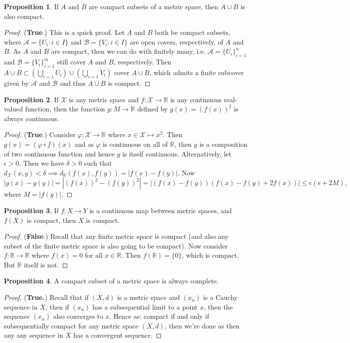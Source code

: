 \documentclass[oneside]{amsart}
\theoremstyle{definition}
\newtheorem{prop}{Proposition}[section]
\newcommand{\rr}{\mathbb R}
\begin{document}
\begin{prop}
If $A$ and $B$ are compact subsets of a metric space, then $A \cup B$ is also compact.	
\end{prop}
\begin{proof}
	(\textbf{True}.) This is a quick proof. Let $A$ and $B$ both be compact subsets, where $\mathcal A = \{ U_i \colon i \in I \}$  and $\mathcal B = \{ V_i \colon i \in I \}$ are open covers, respectively, of $A$ and $B$. As $A$ and $B$ are compact, then we can do with finitely many, i.e. $\mathcal A = \{U_i \}_{i=1}^n$ and $\mathcal B = \{ V_i \}_{i=1}^m$ still cover $A$ and $B$, respectively. Then $A \cup B \subset (\bigcup_{i=1} U_i ) \cup (\bigcup_{i=1} V_i)$ cover $A \cup B$, which admits a finite subcover given by $\mathcal A$ and $\mathcal B$ and thus $A \cup B$ is compact. 
\end{proof}
\begin{prop}
If $\mathcal X$ is any metric space and $f \colon \mathcal X \to \rr$ is any continuous real-valued function, then the function $g \colon M \to \rr$ defined by $g(x) = (f(x))^2$ is always continuous.	
\end{prop}
\begin{proof} (\textbf{True}.) Consider $\varphi \colon \mathcal X \to \rr $ where $x \in \mathcal X\mapsto x^2$. Then $g (x) = (\varphi \circ f) (x)$ and as $\varphi$ is continuous on all of $\rr$, then $g$ is a composition of two continuous function and hence $g$ is itself continuous. Alternatively, let $\epsilon > 0$. Then we have $\delta > 0$ such that $d_\mathcal X (x,y) < \delta \implies d_\rr (f(x), f(y)) = |f(x) - f(y)|.$ Now 
\[
|g(x)-g(y)| = |(f(x))^2-(f(y))^2| = |(f(x)-f(y))(f(x)-f(y)+2f(x))| \leq \epsilon (\epsilon + 2M),
\] where $M = |f(y)|$.
\end{proof}

\begin{prop}
If $f \colon X \to Y$ is a continuous map between metric spaces, and $f(X)$ is compact, then $X$ is compact.	
\end{prop}
\begin{proof}
	(\textbf{False}.) Recall that any finite metric space is compact (and also any subset of the finite metric space is also going to be compact). Now consider $f \colon \rr \to \rr$ where $f(x) = 0$ for all $x \in \rr$. Then $f(\rr) = \{ 0 \}$, which is compact. But $\rr$ itself is not. 
\end{proof}

\begin{prop}
A compact subset of a metric space is always complete.	
\end{prop}
\begin{proof}
	(\textbf{True.}) Recall that if $(X,d)$ is a metric space and $(x_n)$ is a Cauchy sequence in $X$, then if $(x_n)$ has a subsequential limit to a point $x$, then the sequence $(x_n)$ also converges to $x$. Hence as: compact if and only if subsequentially compact for any metric space $(X,d)$, then we're done as then any any sequence in $X$ has a convergent sequence.  
\end{proof}
\end{document}
